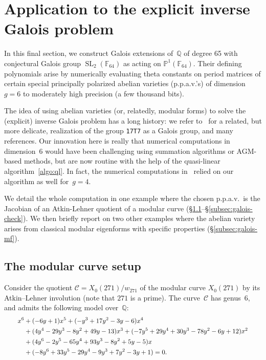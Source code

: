 \documentclass[12pt,oneside]{amsart}
\numberwithin{equation}{section}
\theoremstyle{definition}
\newcommand{\Crv}{\mathcal{C}}
\newcommand{\Q}{\mathbb{Q}}
\newcommand{\F}{\mathbb{F}}
\DeclareMathOperator{\SL}{SL}
\begin{document}
\section{Application to the explicit inverse Galois problem}
\label{sec:galois}

In this final section, we construct Galois extensions of~$\Q$ of degree 65 with
conjectural Galois group $\SL_2(\F_{64})$ as acting on
$\mathbb{P}^1(\F_{64})$. Their defining polynomials arise by numerically
evaluating theta constants on period matrices of certain special principally
polarized abelian varieties (p.p.a.v.'s) of dimension~$g=6$ to moderately high
precision (a few thousand bits).

The idea of using abelian varieties (or, relatedly, modular forms) to solve the
(explicit) inverse Galois problem has a long history: we refer
to~\cite{vanbommel17T7GaloisGroup2024} for a related, but more delicate,
realization of the group \texttt{17T7} as a Galois group, and many
references. Our innovation here is really that numerical computations in
dimension~6 would have been challenging using summation algorithms or AGM-based
methods, but are now routine with the help of the quasi-linear
algorithm~\ref{algo:ql}. In fact, the numerical computations
in~\cite{vanbommel17T7GaloisGroup2024} relied on our algorithm as well
for~$g=4$.

We detail the whole computation in one example where the chosen p.p.a.v.~is the
Jacobian of an Atkin-Lehner quotient of a modular curve
(§\ref{subsec:galois-setup}--§\ref{subsec:galois-check}). We then briefly
report on two other examples where the abelian variety arises from classical
modular eigenforms with specific properties (§\ref{subsec:galois-mf}).


\subsection{The modular curve setup}
\label{subsec:galois-setup}

Consider the quotient $\Crv = X_0(271)/w_{271}$ of the modular curve $X_0(271)$
by its Atkin--Lehner involution (note that $271$ is a prime). The curve~$\Crv$
has genus~6, and admits the following model over~$\Q$:
\begin{equation}
  \scalebox{0.9}{$
  \begin{aligned}
    x^6 &+ (-6y+1)x^5 + (-y^3+17y^2-3y-6)x^4 \\
    &+ (4y^4-29y^3-8y^2+49y-13)x^3 + (-7y^5+29y^4+30y^3-78y^2-6y+12)x^2 \\
    &+ (4y^6-2y^5-65y^4+93y^3-8y^2+5y-5)x \\ &+ (-8y^6+33y^5-29y^4-9y^3+7y^2-3y+1) = 0.
  \end{aligned}$}
\end{equation}
\end{document}
